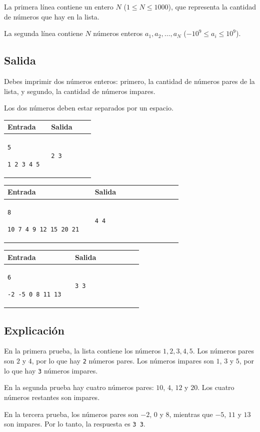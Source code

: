 \documentclass[10pt,letterpaper]{article}
\newcommand{\outputsection}{
  \subsection*{Salida}
}
\newcommand{\explanation}{
  \subsection*{Explicación}
}
\newenvironment{sample}[2]{
  \begin{tcolorbox}[title=Prueba \##1, colback=white, colframe=black, sharp corners,
    fonttitle=\bfseries, breakable]
    \begin{tabular}{|p{0.45\linewidth}|p{0.45\linewidth}|}
      \hline
      \textbf{Entrada} & \textbf{Salida} \\
      \hline
      }{\\ \hline
    \end{tabular}
  \end{tcolorbox}
}
\begin{document}
La primera línea contiene un entero $N$ ($1 \leq N \leq 1000$), que representa la cantidad de números que hay en la lista.

La segunda línea contiene $N$ números enteros $a_1,a_2,\ldots,a_N$ ($-10^9 \leq a_i \leq 10^9$).

\outputsection

Debes imprimir dos números enteros: primero, la cantidad de números pares de la lista, y segundo, la cantidad de números impares.

Los dos números deben estar separados por un espacio.

\begin{sample}{1}{}
  \texttt{5}

  \texttt{1 2 3 4 5}

  &

  \texttt{2 3}
\end{sample}

\begin{sample}{2}{}
  \texttt{8}

  \texttt{10 7 4 9 12 15 20 21}

  &

  \texttt{4 4}
\end{sample}

\begin{sample}{3}{}
  \texttt{6}

  \texttt{-2 -5 0 8 11 13}

  &

  \texttt{3 3}
\end{sample}

\explanation

En la primera prueba, la lista contiene los números $1,2,3,4,5$. Los números pares son $2$ y $4$, por lo que hay \texttt{2} números pares. Los números impares son $1$, $3$ y $5$, por lo que hay \texttt{3} números impares.

En la segunda prueba hay cuatro números pares: $10$, $4$, $12$ y $20$. Los cuatro números restantes son impares.

En la tercera prueba, los números pares son $-2$, $0$ y $8$, mientras que $-5$, $11$ y $13$ son impares. Por lo tanto, la respuesta es \texttt{3 3}.


\label{last-page}
\end{document}
